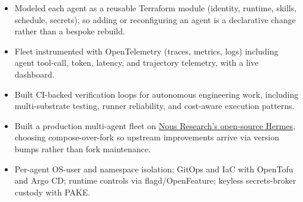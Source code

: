 \begin{itemize}
  \item Modeled each agent as a reusable Terraform module (identity, runtime, skills, schedule, secrets), so adding or reconfiguring an agent is a declarative change rather than a bespoke rebuild.
  \item Fleet instrumented with OpenTelemetry (traces, metrics, logs) including agent tool-call, token, latency, and trajectory telemetry, with a live dashboard.
  \item Built CI-backed verification loops for autonomous engineering work, including multi-substrate testing, runner reliability, and cost-aware execution patterns.
  \item Built a production multi-agent fleet on \href{https://nousresearch.com}{Nous Research's open-source Hermes}, choosing compose-over-fork so upstream improvements arrive via version bumps rather than fork maintenance.
  \item Per-agent OS-user and namespace isolation; GitOps and IaC with OpenTofu and Argo CD; runtime controls via flagd/OpenFeature; keyless secrets-broker custody with PAKE.
\end{itemize}
